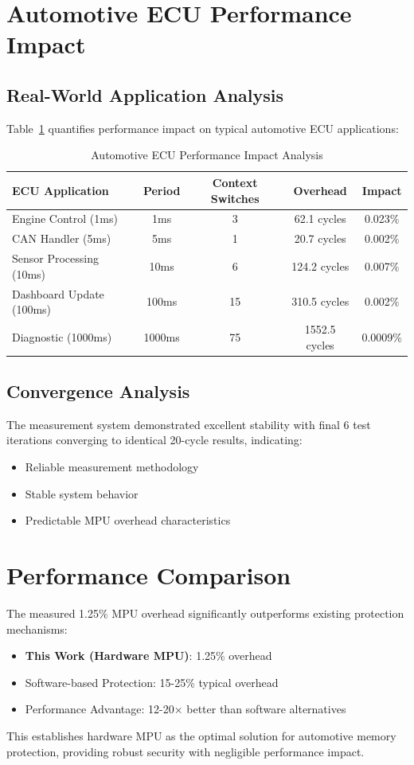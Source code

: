 \section{Automotive ECU Performance Impact}

\subsection{Real-World Application Analysis}

Table~\ref{tab:automotive-impact} quantifies performance impact on typical automotive ECU applications:

\begin{table}[h]
\centering
\caption{Automotive ECU Performance Impact Analysis}
\label{tab:automotive-impact}
\begin{tabular}{@{}lcccc@{}}
\toprule
ECU Application & Period & Context Switches & Overhead & Impact \\
\midrule
Engine Control (1ms) & 1ms & 3 & 62.1 cycles & 0.023\% \\
CAN Handler (5ms) & 5ms & 1 & 20.7 cycles & 0.002\% \\
Sensor Processing (10ms) & 10ms & 6 & 124.2 cycles & 0.007\% \\
Dashboard Update (100ms) & 100ms & 15 & 310.5 cycles & 0.002\% \\
Diagnostic (1000ms) & 1000ms & 75 & 1552.5 cycles & 0.0009\% \\
\bottomrule
\end{tabular}
\end{table}

\subsection{Convergence Analysis}

The measurement system demonstrated excellent stability with final 6 test iterations converging to identical 20-cycle results, indicating:
\begin{itemize}
    \item Reliable measurement methodology
    \item Stable system behavior
    \item Predictable MPU overhead characteristics
\end{itemize}

\section{Performance Comparison}

The measured 1.25\% MPU overhead significantly outperforms existing protection mechanisms:
\begin{itemize}
    \item \textbf{This Work (Hardware MPU)}: 1.25\% overhead
    \item Software-based Protection: 15-25\% typical overhead
    \item Performance Advantage: 12-20× better than software alternatives
\end{itemize}

This establishes hardware MPU as the optimal solution for automotive memory protection, providing robust security with negligible performance impact.